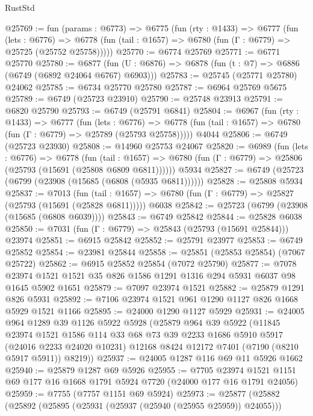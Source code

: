 \begin{lexlean}{RustStd}
\begin{coremodule}
@25769 := fun (params : @6773) =>
  @6775
    (fun (rty : @1433) =>
    @6777
      (fun (lets : @6776) =>
      @6778 (fun (tail : @1657) => @6780 (fun (Γ : @6779) => @25725 (@25752 @25758)))))
@25770 := @6774 @25769
@25771 := @6771 @25770
@25780 := @6877
    (fun (U : @6876) => @6878 (fun (t : @7) => @6886 (@6749 (@6892 @24064 @6767) @6903)))
@25783 := @25745 (@25771 @25780) @24062
@25785 := @6734 @25770 @25780
@25787 := @6964 @25769 @5675
@25789 := @6749 (@25723 @23910)
@25790 := @25748 @23913
@25791 := @6820 @25790
@25793 := @6749 (@25791 @6841)
@25804 := @6967
    (fun (rty : @1433) =>
    @6777
      (fun (lets : @6776) =>
      @6778 (fun (tail : @1657) => @6780 (fun (Γ : @6779) => @25789 (@25793 @25758)))))
    @4044
@25806 := @6749 (@25723 @23930)
@25808 := @14960 @25753 @24067
@25820 := @6989
    (fun (lets : @6776) =>
    @6778
      (fun (tail : @1657) =>
      @6780 (fun (Γ : @6779) => @25806 (@25793 (@15691 (@25808 @6809 @6811))))))
    @5934
@25827 := @6749 (@25723 (@6799 (@23908 (@15685 (@6808 (@5935 @6811))))))
@25828 := @25808 @5934
@25837 := @7013
    (fun (tail : @1657) => @6780 (fun (Γ : @6779) => @25827 (@25793 (@15691 (@25828 @6811)))))
    @6038
@25842 := @25723 (@6799 (@23908 (@15685 (@6808 @6039))))
@25843 := @6749 @25842
@25844 := @25828 @6038
@25850 := @7031 (fun (Γ : @6779) => @25843 (@25793 (@15691 @25844))) @23974
@25851 := @6915 @25842
@25852 := @25791 @23977
@25853 := @6749 @25852
@25854 := @23981 @25844
@25858 := @25851 (@25853 @25854) (@7067 @25722)
@25862 := @6915 @25852 @25854 (@7072 @25790)
@25877 := @7078 @23974 @1521 @1521 @35 @826 @1586 @1291 @1316 @294 @5931 @6037 @98 @1645 @5902 @1651
@25879 := @7097 @23974 @1521
@25882 := @25879 @1291 @826 @5931
@25892 := @7106 @23974 @1521 @961 @1290 @1127 @826 @1668 @5929 @1521 @1166
@25895 := @24000 @1290 @1127 @5929
@25931 := @24005
    @964
    @1289
    @39
    @1126
    @5922
    @5928
    (@25879
      @964
      @39
      @5922
      (@11845
        @23974
        @1521
        @1586
        @114
        @33
        @68
        @73
        @39
        @2233
        @1686
        @5910
        @5917
        (@24016 @2233 @24020 @10231)
        @12168
        @8424
        @12172
        @7401
        (@7190 (@8210 @5917 @5911))
        @8219))
@25937 := @24005 @1287 @116 @69 @11 @5926 @1662
@25940 := @25879 @1287 @69 @5926
@25955 := @7705
    @23974
    @1521
    @1151
    @69
    @177
    @16
    @1668
    @1791
    @5924
    @7720
    (@24000 @177 @16 @1791 @24056)
@25959 := @7755 (@7757 @1151 @69 @5924)
@25973 := @25877
    (@25882
      (@25892
        (@25895 (@25931 (@25937 (@25940 (@25955 @25959)) @24055)))

\end{coremodule}
\end{lexlean}
